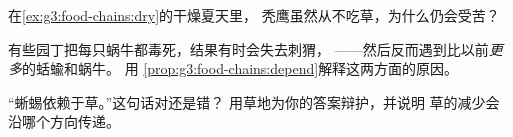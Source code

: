 \begin{exercise}[$\star$]\label{exo:g3:food-chains:8}
在\cref{ex:g3:food-chains:dry}的干燥夏天里，
秃鹰虽然从不吃草，为什么仍会受苦？
\end{exercise}

\begin{exercise}[$\star\star$]\label{exo:g3:food-chains:9}
有些园丁把每只蜗牛都毒死，结果有时会失去刺猬，
——然后反而遇到比以前\emph{更多}的蛞蝓和蜗牛。
用
\cref{prop:g3:food-chains:depend}解释这两方面的原因。
\end{exercise}

\begin{exercise}[$\star\star$]\label{exo:g3:food-chains:10}
“蜥蜴依赖于草。”这句话对还是错？
用草地为你的答案辩护，并说明
草的减少会沿哪个方向传递。
\end{exercise}
